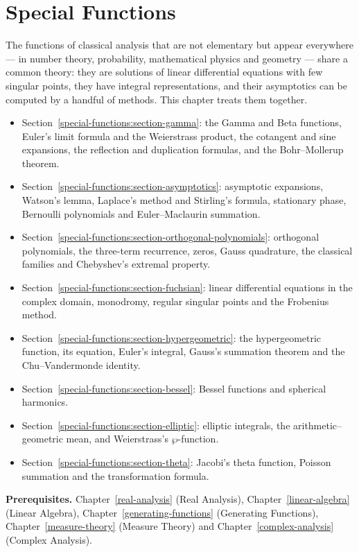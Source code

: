 \chapter{Special Functions}\label{special-functions}

The functions of classical analysis that are not elementary but appear everywhere --- in number theory,
probability, mathematical physics and geometry --- share a common theory: they are solutions of linear
differential equations with few singular points, they have integral representations, and their
asymptotics can be computed by a handful of methods. This chapter treats them together.
\begin{itemize}
\item Section~\ref{special-functions:section-gamma}: the Gamma and Beta functions, Euler's limit formula and the Weierstrass product, the cotangent and sine expansions, the reflection and
duplication formulas, and the Bohr--Mollerup theorem.
\item Section~\ref{special-functions:section-asymptotics}: asymptotic expansions, Watson's lemma, Laplace's method and Stirling's formula, stationary phase, Bernoulli polynomials and Euler--Maclaurin summation.
\item Section~\ref{special-functions:section-orthogonal-polynomials}: orthogonal polynomials, the three-term recurrence, zeros, Gauss quadrature, the classical families and Chebyshev's extremal property.
\item Section~\ref{special-functions:section-fuchsian}: linear differential equations in the complex domain, monodromy, regular singular points and the Frobenius method.
\item Section~\ref{special-functions:section-hypergeometric}: the hypergeometric function, its equation, Euler's integral, Gauss's summation theorem and the Chu--Vandermonde identity.
\item Section~\ref{special-functions:section-bessel}: Bessel functions and spherical harmonics.
\item Section~\ref{special-functions:section-elliptic}: elliptic integrals, the arithmetic--geometric mean, and Weierstrass's $\wp$-function.
\item Section~\ref{special-functions:section-theta}: Jacobi's theta function, Poisson summation and the transformation formula.
\end{itemize}

\noindent\textbf{Prerequisites.} Chapter~\ref{real-analysis} (Real Analysis), Chapter~\ref{linear-algebra} (Linear Algebra), Chapter~\ref{generating-functions} (Generating Functions),
Chapter~\ref{measure-theory} (Measure Theory) and Chapter~\ref{complex-analysis} (Complex Analysis).

